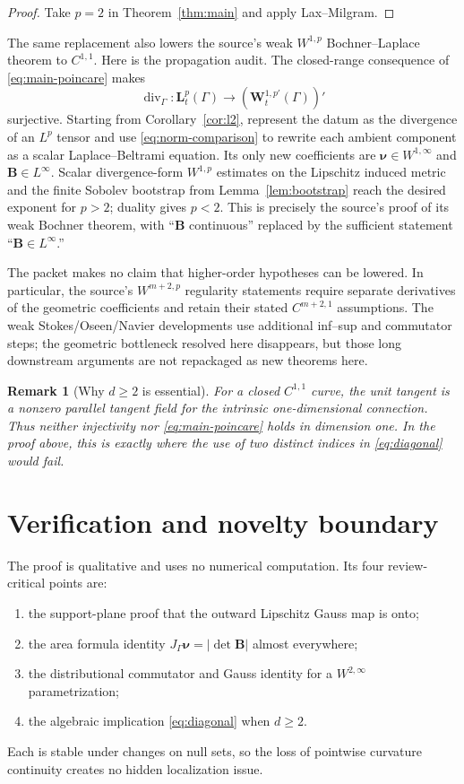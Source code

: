 \documentclass[11pt]{article}
\newtheorem{remark}[theorem]{Remark}
\newcommand{\G}{\Gamma}
\newcommand{\nuG}{\boldsymbol\nu}
\newcommand{\BG}{\mathbf B}
\newcommand{\divG}{\operatorname{div}_{\!\G}}
\begin{document}
\begin{proof}
Take $p=2$ in Theorem~\ref{thm:main} and apply Lax--Milgram.
\end{proof}

The same replacement also lowers the source's weak $W^{1,p}$
Bochner--Laplace theorem to $C^{1,1}$.  Here is the propagation audit.  The
closed-range consequence of \eqref{eq:main-poincare} makes
\[
 \divG:\mathbf L^p_t(\G)\longrightarrow(\mathbf W^{1,p'}_t(\G))'
\]
surjective.  Starting from Corollary~\ref{cor:l2}, represent the datum as the
divergence of an $L^p$ tensor and use \eqref{eq:norm-comparison} to rewrite
each ambient component as a scalar Laplace--Beltrami equation.  Its only new
coefficients are $\nuG\in W^{1,\infty}$ and $\BG\in L^\infty$.  Scalar
divergence-form $W^{1,p}$ estimates on the Lipschitz induced metric and the
finite Sobolev bootstrap from Lemma~\ref{lem:bootstrap} reach the desired
exponent for $p>2$; duality gives $p<2$.  This is precisely the source's proof
of its weak Bochner theorem, with ``$\BG$ continuous'' replaced by the
sufficient statement ``$\BG\in L^\infty$.''

The packet makes no claim that higher-order hypotheses can be lowered.  In
particular, the source's $W^{m+2,p}$ regularity statements require separate
derivatives of the geometric coefficients and retain their stated
$C^{m+2,1}$ assumptions.  The weak Stokes/Oseen/Navier developments use
additional inf--sup and commutator steps; the geometric bottleneck resolved
here disappears, but those long downstream arguments are not repackaged as
new theorems here.

\begin{remark}[Why $d\ge2$ is essential]
For a closed $C^{1,1}$ curve, the unit tangent is a nonzero parallel tangent
field for the intrinsic one-dimensional connection.  Thus neither
injectivity nor \eqref{eq:main-poincare} holds in dimension one.  In the
proof above, this is exactly where the use of two distinct indices in
\eqref{eq:diagonal} would fail.
\end{remark}

\section{Verification and novelty boundary}

The proof is qualitative and uses no numerical computation.  Its four
review-critical points are:
\begin{enumerate}
\item the support-plane proof that the outward Lipschitz Gauss map is onto;
\item the area formula identity $J_\G\nuG=|\det\BG|$ almost everywhere;
\item the distributional commutator and Gauss identity for a
$W^{2,\infty}$ parametrization;
\item the algebraic implication \eqref{eq:diagonal} when $d\ge2$.
\end{enumerate}
Each is stable under changes on null sets, so the loss of pointwise curvature
continuity creates no hidden localization issue.
\end{document}
